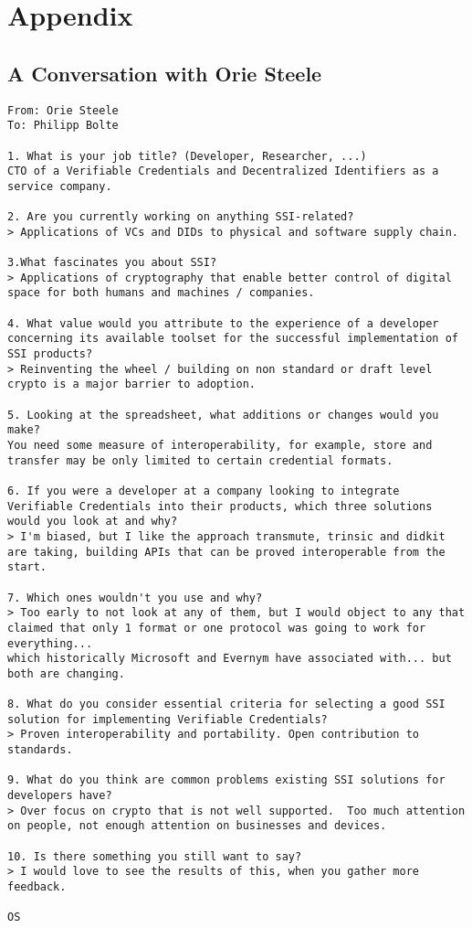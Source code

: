 \appendix
\chapter*{Appendix}\label{chapter: appendix}

\section*{A Conversation with Orie Steele}\label{appendix: steele}
\begin{Verbatim}[breaklines=true, breaksymbol={}, breaksymbolsepleftnchars=2]
From: Orie Steele
To: Philipp Bolte

1. What is your job title? (Developer, Researcher, ...)
CTO of a Verifiable Credentials and Decentralized Identifiers as a service company.
 
2. Are you currently working on anything SSI-related?
> Applications of VCs and DIDs to physical and software supply chain.
 
3.What fascinates you about SSI?
> Applications of cryptography that enable better control of digital space for both humans and machines / companies.
 
4. What value would you attribute to the experience of a developer concerning its available toolset for the successful implementation of SSI products?
> Reinventing the wheel / building on non standard or draft level crypto is a major barrier to adoption.
 
5. Looking at the spreadsheet, what additions or changes would you make?
You need some measure of interoperability, for example, store and transfer may be only limited to certain credential formats.
 
6. If you were a developer at a company looking to integrate Verifiable Credentials into their products, which three solutions would you look at and why?
> I'm biased, but I like the approach transmute, trinsic and didkit are taking, building APIs that can be proved interoperable from the start.
 
7. Which ones wouldn't you use and why?
> Too early to not look at any of them, but I would object to any that claimed that only 1 format or one protocol was going to work for everything... 
which historically Microsoft and Evernym have associated with... but both are changing.
 
8. What do you consider essential criteria for selecting a good SSI solution for implementing Verifiable Credentials?
> Proven interoperability and portability. Open contribution to standards. 
 
9. What do you think are common problems existing SSI solutions for developers have? 
> Over focus on crypto that is not well supported.  Too much attention on people, not enough attention on businesses and devices.
 
10. Is there something you still want to say?
> I would love to see the results of this, when you gather more feedback.

OS
\end{Verbatim}

